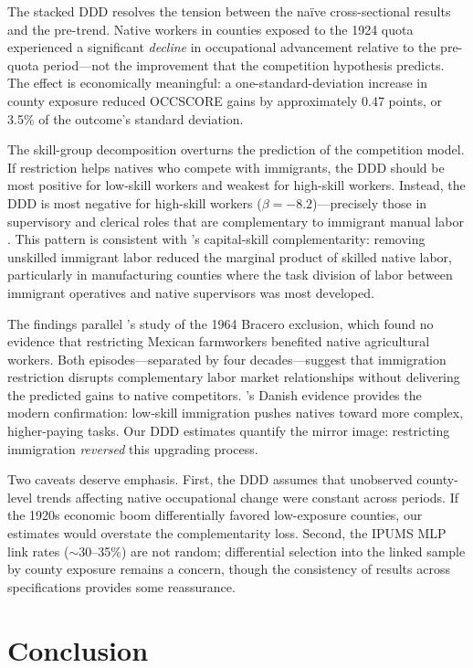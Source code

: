 \documentclass[12pt]{article}
\begin{document}
The stacked DDD resolves the tension between the na\"ive cross-sectional results and the pre-trend. Native workers in counties exposed to the 1924 quota experienced a significant \emph{decline} in occupational advancement relative to the pre-quota period---not the improvement that the competition hypothesis predicts. The effect is economically meaningful: a one-standard-deviation increase in county exposure reduced OCCSCORE gains by approximately 0.47 points, or 3.5\% of the outcome's standard deviation.

The skill-group decomposition overturns the prediction of the competition model. If restriction helps natives who compete with immigrants, the DDD should be most positive for low-skill workers and weakest for high-skill workers. Instead, the DDD is most negative for high-skill workers ($\beta = -8.2$)---precisely those in supervisory and clerical roles that are complementary to immigrant manual labor \citep{peri2009task}. This pattern is consistent with \citet{lewis2011}'s capital-skill complementarity: removing unskilled immigrant labor reduced the marginal product of skilled native labor, particularly in manufacturing counties where the task division of labor between immigrant operatives and native supervisors was most developed.

The findings parallel \citet{clemens2022}'s study of the 1964 Bracero exclusion, which found no evidence that restricting Mexican farmworkers benefited native agricultural workers. Both episodes---separated by four decades---suggest that immigration restriction disrupts complementary labor market relationships without delivering the predicted gains to native competitors. \citet{fogedperi2016}'s Danish evidence provides the modern confirmation: low-skill immigration pushes natives toward more complex, higher-paying tasks. Our DDD estimates quantify the mirror image: restricting immigration \emph{reversed} this upgrading process.

Two caveats deserve emphasis. First, the DDD assumes that unobserved county-level trends affecting native occupational change were constant across periods. If the 1920s economic boom differentially favored low-exposure counties, our estimates would overstate the complementarity loss. Second, the IPUMS MLP link rates ($\sim$30--35\%) are not random; differential selection into the linked sample by county exposure remains a concern, though the consistency of results across specifications provides some reassurance.


\section{Conclusion}
\label{sec:conclusion}
\end{document}
